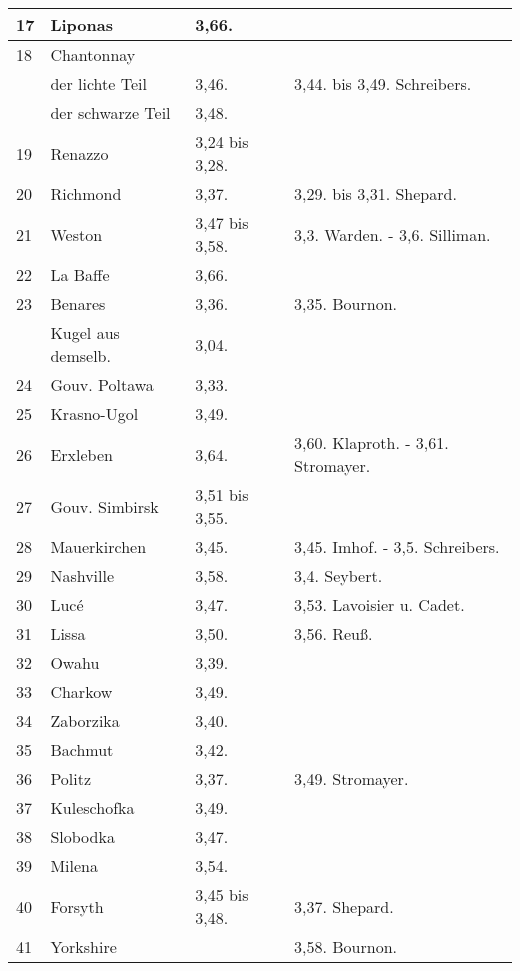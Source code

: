 \documentclass[a4paper, 11pt, oneside, polutonikogreek, german]{article}
\begin{document}
\begin{center}
\begin{longtable}{|p{7mm}|p{32mm}|p{30mm}|p{30mm}|}
        17 & Liponas & 3,66. &   \\ \hline
        18 & Chantonnay &   &   \\ \hline
          & der lichte Teil & 3,46. & 3,44. bis 3,49. Schreibers. \\ \hline
          & der schwarze Teil & 3,48. &   \\ \hline
        19 & Renazzo & 3,24 bis 3,28. &   \\ \hline
        20 & Richmond & 3,37. & 3,29. bis 3,31. Shepard. \\ \hline
        21 & Weston & 3,47 bis 3,58. & 3,3. Warden. - 3,6. Silliman. \\ \hline
        22 & La Baffe & 3,66. &   \\ \hline
        23 & Benares & 3,36. & 3,35. Bournon. \\ \hline
          & Kugel aus demselb. & 3,04. &   \\ \hline
        24 & Gouv. Poltawa & 3,33. &   \\ \hline
        25 & Krasno-Ugol & 3,49. &   \\ \hline
        26 & Erxleben & 3,64. & 3,60. Klaproth. - 3,61. Stromayer. \\ \hline
        27 & Gouv. Simbirsk & 3,51 bis 3,55. &   \\ \hline
        28 & Mauerkirchen & 3,45. & 3,45. Imhof. - 3,5. Schreibers. \\ \hline
        29 & Nashville & 3,58. & 3,4. Seybert. \\ \hline
        30 & Lucé & 3,47. & 3,53. Lavoisier u. Cadet. \\ \hline
        31 & Lissa & 3,50. & 3,56. Reuß. \\ \hline
        32 & Owahu & 3,39. &   \\ \hline
        33 & Charkow & 3,49. &   \\ \hline
        34 & Zaborzika & 3,40. &   \\ \hline
        35 & Bachmut & 3,42. &   \\ \hline
        36 & Politz & 3,37. & 3,49. Stromayer. \\ \hline
        37 & Kuleschofka & 3,49. &   \\ \hline
        38 & Slobodka & 3,47. &   \\ \hline
        39 & Milena & 3,54. &   \\ \hline
        40 & Forsyth & 3,45 bis 3,48. & 3,37. Shepard. \\ \hline
        41 & Yorkshire &   & 3,58. Bournon. \\ \hline

\end{longtable}
\end{center}
\end{document}
